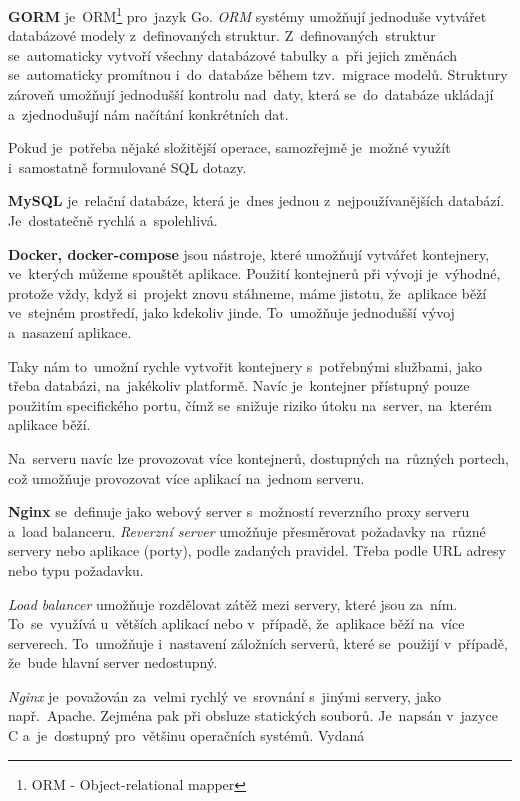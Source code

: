 \documentclass[14pt,a4paper]{article}
\begin{document}
            \textbf{GORM} je~ORM\footnote{ORM - Object-relational mapper} pro~jazyk Go. \emph{ORM} systémy umožňují jednoduše vytvářet databázové modely z~definovaných struktur. 
            Z~definovaných~struktur se~automaticky vytvoří všechny databázové tabulky a~při jejich změnách se~automaticky promítnou i~do~databáze během tzv.~migrace modelů.
            Struktury zároveň umožňují jednodušší kontrolu nad~daty, která se~do~databáze ukládají a~zjednodušují nám načítání konkrétních dat. \parencite{freecodecamp:orm}

            Pokud je~potřeba nějaké složitější operace, samozřejmě je~možné využít i~samostatně formulované SQL dotazy. \parencite{gormGORM}
            
            \textbf{MySQL} je~relační databáze, která je~dnes jednou z~nejpoužívanějších databází. Je~dostatečně rychlá a~spolehlivá. \parencite{databases21}

            \textbf{Docker, docker-compose} jsou nástroje, které umožňují vytvářet kontejnery, ve~kterých můžeme spouštět aplikace.
            Použití kontejnerů při vývoji je~výhodné, protože vždy, když si~projekt znovu stáhneme, máme jistotu, že~aplikace běží
            ve~stejném prostředí, jako kdekoliv jinde. To~umožňuje jednodušší vývoj a~nasazení aplikace.

            Taky nám to~umožní rychle vytvořit kontejnery s~potřebnými službami, jako třeba databázi, na~jakékoliv platformě. Navíc je~kontejner přístupný pouze použitím specifického portu,
            čímž se~snižuje riziko útoku na~server, na~kterém aplikace běží. \parencite{docker}

            Na~serveru navíc lze provozovat více kontejnerů, dostupných na~různých portech, což umožňuje provozovat více aplikací na~jednom serveru.

            \textbf{Nginx} se~definuje jako webový server s~možností reverzního proxy serveru a~load balanceru.
            \emph{Reverzní server} umožňuje přesměrovat požadavky na~různé servery nebo aplikace (porty), podle zadaných pravidel.
            Třeba podle URL adresy nebo typu požadavku.
            
            \emph{Load balancer} umožňuje rozdělovat zátěž mezi servery, které jsou za~ním. To~se~využívá u~větších aplikací nebo v~případě, že~aplikace běží na~více serverech.
            To~umožňuje i~nastavení záložních serverů, které se~použijí v~případě, že~bude hlavní server nedostupný.
            
            \emph{Nginx} je~považován za~velmi rychlý ve~srovnání s~jinými servery, jako např.~Apache. Zejména pak při obsluze statických souborů.
            Je~napsán v~jazyce C a~je~dostupný pro~většinu operačních systémů. Vydaná  \parencite{WhatNGINX}
\end{document}

